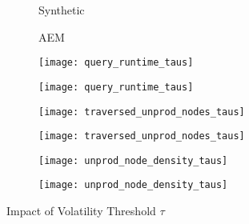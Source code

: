 \documentclass[abstracton,12pt]{scrartcl}
\theoremstyle{definition}
\begin{document}
\begin{figure}[h]
  \centering
  \begin{subfigure}{0.49\linewidth}
    \centering
    Synthetic
  \end{subfigure}
  \begin{subfigure}{0.49\linewidth}
    \centering
    AEM
  \end{subfigure}
  \begin{subfigure}{0.49\linewidth}
    \centering
    \texttt{[image: query\_runtime\_taus]}
    \caption{}
    \label{fig:query_runtime_taus_synthetic}
  \end{subfigure}
  \begin{subfigure}{0.49\linewidth}
    \centering
    \texttt{[image: query\_runtime\_taus]}
    \caption{}
    \label{fig:query_runtime_taus_aem}
  \end{subfigure}
  \begin{subfigure}{0.49\linewidth}
    \centering
    \texttt{[image: traversed\_unprod\_nodes\_taus]}
    \caption{}
    \label{fig:trav_unprod_nodes_taus_synthetic}
  \end{subfigure}
  \begin{subfigure}{0.49\linewidth}
    \centering
    \texttt{[image: traversed\_unprod\_nodes\_taus]}
    \caption{}
    \label{fig:trav_unprod_nodes_taus_aem}
  \end{subfigure}
  \begin{subfigure}{0.49\linewidth}
    \centering
    \texttt{[image: unprod\_node\_density\_taus]}
    \caption{}
    \label{fig:unprod_node_density_taus_synthetic}
  \end{subfigure}
  \begin{subfigure}{0.49\linewidth}
    \centering
    \texttt{[image: unprod\_node\_density\_taus]}
    \caption{}
    \label{fig:unprod_node_density_taus_aem}
  \end{subfigure}
  \caption{Impact of Volatility Threshold $\tau$}
\end{figure}
\end{document}
